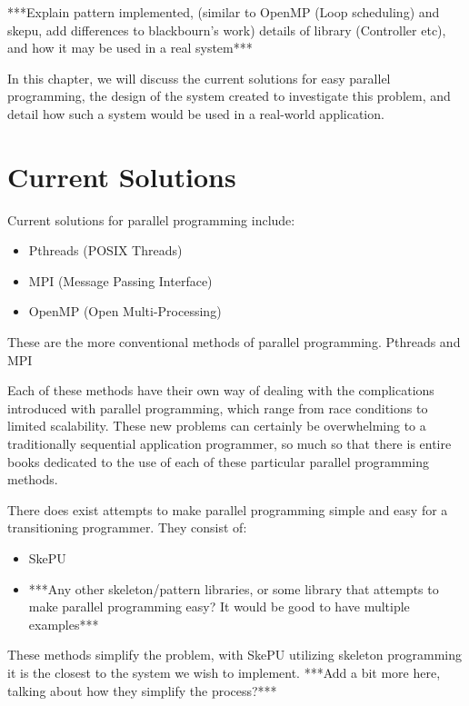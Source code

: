 ***Explain pattern implemented, (similar to OpenMP (Loop scheduling) and skepu, add differences to blackbourn's work) details of library (Controller etc), and how it may be used in a real system***

In this chapter, we will discuss the current solutions for easy parallel programming, the design of the system created to investigate this problem, and detail how such a system would be used in a real-world application.

\section{Current Solutions}

Current solutions for parallel programming include:

\begin{itemize}
	\item Pthreads (POSIX Threads)
	\item MPI 	   (Message Passing Interface)
	\item OpenMP   (Open Multi-Processing)
\end{itemize}

These are the more conventional methods of parallel programming. Pthreads and MPI 

Each of these methods have their own way of dealing with the complications introduced with parallel programming, which range from race conditions to limited scalability. These new problems can certainly be overwhelming to a traditionally sequential application programmer, so much so that there is entire books dedicated to the use of each of these particular parallel programming methods. 

There does exist attempts to make parallel programming simple and easy for a transitioning programmer. They consist of:

\begin{itemize}
	\item SkePU
	\item ***Any other skeleton/pattern libraries, or some library that attempts to make parallel programming easy? It would be good to have multiple examples***
\end{itemize}

These methods simplify the problem, with SkePU utilizing skeleton programming it is the closest to the system we wish to implement.
***Add a bit more here, talking about how they simplify the process?***

